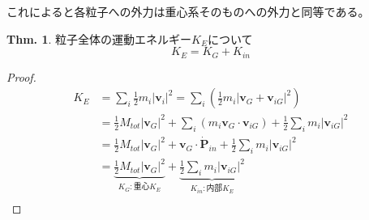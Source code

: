 \documentclass[dvipdfmx,uplatex]{jsarticle}
\theoremstyle{definition}
\newtheorem{theo}[law]{Thm.}
\begin{document}
これによると各粒子への外力は重心系そのものへの外力と同等である。

\begin{theo}
粒子全体の運動エネルギー$K_E$について \\
$$
K_E = K_G + K_{in}
$$
\end{theo}

\begin{proof}
  \begin{align*}
    K_E &= \sum_i \frac{1}{2} m_i |\bm{v}_i|^2
    = \sum_i \left( \frac{1}{2} m_i | \bm{v}_G + \bm{v}_{iG} |^2 \right)\\
    &= \frac{1}{2} M_{tot} |\bm{v}_G|^2 + \sum_i ( m_i \bm{v}_G \cdot \bm{v}_{iG} ) + \frac{1}{2} \sum_i m_i |\bm{v}_{iG}|^2 \\
    &= \frac{1}{2} M_{tot} |\bm{v}_G|^2 + \bm{v}_G \cdot \dot{\bm{P}}_{in} + \frac{1}{2} \sum_i m_i |\bm{v}_{iG}|^2 \\
    &= \underbrace{\frac{1}{2} M_{tot} |\bm{v}_G|^2}_{K_G:重心K_E} + \underbrace{\frac{1}{2} \sum_i m_i |\bm{v}_{iG}|^2}_{K_{in}:内部K_E} \\
  \end{align*}
\end{proof}
\end{document}
